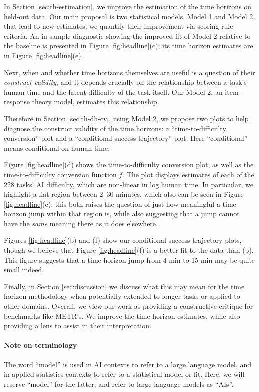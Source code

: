 \documentclass{article}
\theoremstyle{definition}
\begin{document}
In Section \ref{sec:th-estimation}, we improve the estimation of the time horizons on held-out data. Our main proposal is two statistical models, Model 1 and Model 2, that lead to new estimates; we quantify their improvement via scoring rule criteria. An in-sample diagnostic showing the improved fit of Model 2 relative to the baseline is presented in Figure \ref{fig:headline}(c); its time horizon estimates are in Figure \ref{fig:headline}(e). 

Next, when and whether time horizons themselves are useful is a question of their \emph{construct validity}, and it depends crucially on the relationship between a task's human time and the latent difficulty of the task itself. Our Model 2, an item-response theory model, estimates this relationship. 

Therefore in Section \ref{sec:th-dh-cv}, using Model 2, we propose two plots to help diagnose the construct validity of the time horizons: a ``time-to-difficulty conversion'' plot and a ``conditional success trajectory'' plot. Here ``conditional'' means conditional on human time. 

Figure \ref{fig:headline}(d) shows the time-to-difficulty conversion plot, as well as the time-to-difficulty conversion function $f$. The plot displays estimates of each of the 228 tasks' AI difficulty, which are non-linear in log human time. In particular, we highlight a flat region between 2--30 minutes, which also can be seen in Figure \ref{fig:headline}(c); this both raises the question of just how meaningful a time horizon jump within that region is, while also suggesting that a jump cannot have the \emph{same} meaning there as it does elsewhere.

Figures \ref{fig:headline}(b) and (f) show our conditional success trajectory plots, though we believe that Figure \ref{fig:headline}(f) is a better fit to the data than (b). This figure suggests that a time horizon jump from 4 min to 15 min may be quite small indeed.

Finally, in Section \ref{sec:discussion} we discuss what this may mean for the time horizon methodology when potentially extended to longer tasks or applied to other domains. Overall, we view our work as providing a constructive critique for benchmarks like METR's. We improve the time horizon estimates, while also providing a lens to assist in their interpretation.

\paragraph{Note on terminology} The word ``model'' is used in AI contexts to refer to a large language model, and in applied statistics contexts to refer to a statistical model or fit. Here, we will reserve ``model'' for the latter, and refer to large language models as ``AIs''. 
\end{document}
